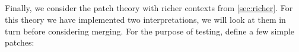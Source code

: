 \begin{code}[hide]%
\>[0]\AgdaSpace{}%
\AgdaSpace{}%
\<%
\\
\>[0][@{}l@{\AgdaIndent{0}}]%
\>[2]\AgdaSpace{}%
\AgdaSpace{}%
\AgdaSpace{}%
\<%
\\
%
\\[\AgdaEmptyExtraSkip]%
%
\>[2]\AgdaSpace{}%
\AgdaSymbol{:}\AgdaSpace{}%
\AgdaSymbol{\{}\AgdaSpace{}%
\AgdaSymbol{:}\AgdaSpace{}%
\AgdaSymbol{\}}\AgdaSpace{}%
\AgdaSpace{}%
\AgdaSymbol{(}\AgdaSpace{}%
\AgdaSymbol{:}\AgdaSpace{}%
\AgdaSymbol{)}\AgdaSpace{}%
\AgdaSpace{}%
\AgdaSpace{}%
\<%
\\
%
\>[2]\AgdaSpace{}%
\AgdaSpace{}%
\AgdaSymbol{=}\AgdaSpace{}%
\AgdaSpace{}%
\AgdaOperator{\AgdaInductiveConstructor{,}}\AgdaSpace{}%
\<%
\end{code}
Finally, we consider the patch theory with richer contexts from \autoref{sec:richer}.
For this theory we have implemented two interpretations, we will look at them in turn
before considering merging. For the purpose of testing, define a few simple patches:
